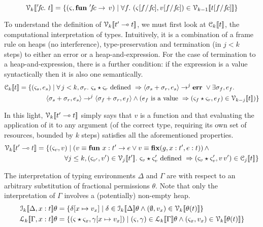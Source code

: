 \vspace{-\baselineskip}
\[
    \V{k}{ '\!f\!c.\  t } = \{ (\varsigma, \ottkw{fun}\ '\!f\!c \rightarrow \, v) \mid \forall f.\ (\varsigma [f / f\!c], v [f / f\!c]) \in \V{k-1}{ t [f / f\!c] } \}
\]

To understand the definition of $\mathcal{V}_{k} [\![ t' \multimap t ]\!]$, we must first look at
$\mathcal{C}_{k} [\![ t ]\!]$, the computational interpretation of types. Intuitively, it is a
combination of a frame rule on heaps (no interference), type-preservation and
termination (in $j < k$ steps) to either an error or a heap-and-expression.
For the case of termination to a heap-and-expression, there is a further
condition: if the expression is a value syntactically then it is also one
semantically.
\begin{align*}
    \mathcal{C}_{k} [\![  t  ]\!] &= \{ (\varsigma_s, e_s) \mid \forall \, j < k, \sigma_r.\ \varsigma_s \star \varsigma_r \textrm{ defined } \Rightarrow \langle \sigma_s + \sigma_r, e_s \rangle \rightarrow^j \mathbf{err}\ \vee \exists \sigma_f, e_f.\\
               & \qquad \qquad \langle \sigma_s + \sigma_r, e_s \rangle \rightarrow^j \langle \sigma_f + \sigma_r, e_f \rangle \wedge ( e_f \textrm { is a value } \Rightarrow ( \varsigma_f \star \varsigma_r, e_f ) \in \mathcal{V}_{k-j} [\![ t ]\!] ) \}
\end{align*}

In this light, $\mathcal{V}_{k} [\![ t' \multimap t ]\!]$ simply says
that $v$ is a function and that evaluating the application of it to any
argument (of the correct type, requiring its own set of resources, bounded by
$k$ steps) satisfies all the aforementioned properties.
\begin{align*}
    \mathcal{V}_{k} [\![  t' \multimap t  ]\!] &= \{ (\varsigma_v, v ) \mid ( v \equiv \mathbf{fun}\ x : t' \rightarrow e \vee v \equiv \mathbf{fix} (g, x : t' , e : t) ) \, \wedge\\
                            & \qquad \qquad \forall j \leq k, (\varsigma_{v'}, v') \in \mathcal{V}_{j} [\![  t'  ]\!].\ \varsigma_v \star \varsigma_v' \textrm{ defined } \Rightarrow (\varsigma_v \star \varsigma_v', v\, v') \in \mathcal{C}_{j} [\![ t ]\!] \}
\end{align*}

The interpretation of typing environments $\Delta$ and $\Gamma$ are with
respect to an arbitrary substitution of fractional permissions $\theta$. Note
that only the interpretation of $\Gamma$ involves a (potentially) non-empty heap.
\begin{align*}
    \den{I}{k}{ \Delta, x : t } \theta &= \{ \delta[x \mapsto v_x] \mid \delta \in \den{I}{k}{\Delta}\theta \wedge (\empH, v_x) \in \V{k}{\theta(t)} \} \\
    \den{L}{k}{ \Gamma, x : t } \theta &= \{ (\varsigma \star \varsigma_x, \gamma[x \mapsto v_x]) \mid (\varsigma, \gamma) \in \den{L}{k}{\Gamma}\theta \wedge (\varsigma_x, v_x) \in \V{k}{\theta(t)} \}
\end{align*}

